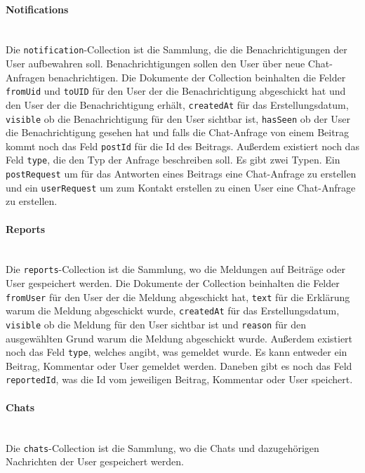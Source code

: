 \paragraph{Notifications}\mbox{} \\
Die \texttt{notification}-Collection ist die Sammlung, die die Benachrichtigungen der User aufbewahren soll. Benachrichtigungen sollen den User über neue Chat-Anfragen benachrichtigen. Die Dokumente der Collection beinhalten die Felder \texttt{fromUid} und \texttt{toUID} für den User der die Benachrichtigung abgeschickt hat und den User der die Benachrichtigung erhält, \texttt{createdAt} für das Erstellungsdatum, \texttt{visible} ob die Benachrichtigung für den User sichtbar ist, \texttt{hasSeen} ob der User die Benachrichtigung gesehen hat und falls die Chat-Anfrage von einem Beitrag kommt noch das Feld \texttt{postId} für die Id des Beitrags. Außerdem existiert noch das Feld \texttt{type}, die den Typ der Anfrage beschreiben soll. Es gibt zwei Typen. Ein \texttt{postRequest} um für das Antworten eines Beitrags eine Chat-Anfrage zu erstellen und ein \texttt{userRequest} um zum Kontakt erstellen zu einen User eine Chat-Anfrage zu erstellen.

\paragraph{Reports}\mbox{} \\
Die \texttt{reports}-Collection ist die Sammlung, wo die Meldungen auf Beiträge oder User gespeichert werden. Die Dokumente der Collection beinhalten die Felder \texttt{fromUser} für den User der die Meldung abgeschickt hat, \texttt{text} für die Erklärung warum die Meldung abgeschickt wurde, \texttt{createdAt} für das Erstellungsdatum, \texttt{visible} ob die Meldung für den User sichtbar ist und \texttt{reason} für den ausgewählten Grund warum die Meldung abgeschickt wurde. Außerdem existiert noch das Feld \texttt{type}, welches angibt, was gemeldet wurde. Es kann entweder ein Beitrag, Kommentar oder User gemeldet werden. Daneben gibt es noch das Feld \texttt{reportedId}, was die Id vom jeweiligen Beitrag, Kommentar oder User speichert.

\paragraph{Chats}\mbox{} \\
Die \texttt{chats}-Collection ist die Sammlung, wo die Chats und dazugehörigen Nachrichten der User gespeichert werden.


